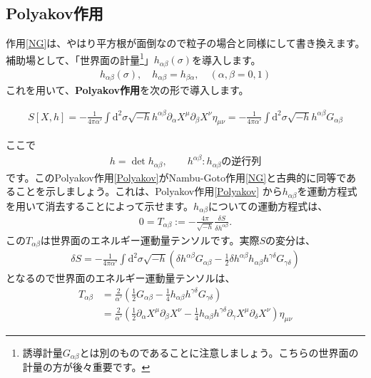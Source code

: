 \documentclass[report,paper=a4, fontsize=12pt, line_length=16cm, number_of_lines=33,dvipdfmx]{jlreq}
\newenvironment{important}{\begin{tcolorbox}[
  colback = white,
  colframe = red!35,
  boxrule = 2mm,
  fonttitle = \bfseries,
  after = \noindent] }{\end{tcolorbox}}
\numberwithin{equation}{chapter}
\numberwithin{equation}{section}
\newcommand{\del}{\partial}
\newcommand{\kyou}[1]{{\sffamily \bfseries #1}}
\newcommand{\di}{\mathrm{d}}
\begin{document}
\subsection{Polyakov作用}
作用\eqref{NG}は、やはり平方根が面倒なので粒子の場合と同様にして書き換えます。
補助場として、「世界面の計量\footnote{誘導計量$G_{\alpha\beta}$とは別のものであることに注意しましょう。こちらの世界面の計量の方が後々重要です。}」$h_{\alpha\beta}(\sigma)$を導入します。
\begin{align}
h_{\alpha\beta}(\sigma),\quad
h_{\alpha\beta}=h_{\beta\alpha},\quad
(\alpha,\beta=0,1)
\end{align}
これを用いて、\kyou{Polyakov作用}を次の形で導入します。
\begin{important}
  \begin{align}
    S[X,h]=-\frac{1}{4\pi\alpha'}\int \di^2\sigma \sqrt{-h}h^{\alpha\beta}\del_{\alpha}X^{\mu}\del_{\beta}X^{\nu}\eta_{\mu\nu}=
    -\frac{1}{4\pi\alpha'}\int \di^2\sigma \sqrt{-h}h^{\alpha\beta}G_{\alpha\beta}
    \label{Polyakov}
    \end{align}      
\end{important}
ここで
\begin{align}
h=\det h_{\alpha\beta},\qquad h^{\alpha\beta} : h_{\alpha\beta}\text{の逆行列}
\end{align}
です。このPolyakov作用\eqref{Polyakov}がNambu-Goto作用\eqref{NG}と古典的に同等であることを示しましょう。これは、Polyakov作用\eqref{Polyakov}
から$h_{\alpha\beta}$を運動方程式を用いて消去することによって示せます。$h_{\alpha\beta}$についての運動方程式は、
\begin{align}
0=T_{\alpha\beta}:=-\frac{4\pi}{\sqrt{-h}}\frac{\delta S}{\delta h^{\alpha\beta}}. \label{constraintT}
\end{align}
この$T_{\alpha\beta}$は世界面のエネルギー運動量テンソルです。実際$S$の変分は、
\begin{align}
\delta S=-\frac{1}{4\pi\alpha'}\int \di^2\sigma \sqrt{-h}\left(\delta h^{\alpha\beta}G_{\alpha\beta}-\frac12 \delta h^{\alpha\beta} h_{\alpha\beta}
h^{\gamma\delta}G_{\gamma\delta}
\right)
\end{align}
となるので世界面のエネルギー運動量テンソルは、
\begin{align}
 T_{\alpha\beta}&=\frac{2}{\alpha'}\left(\frac12 G_{\alpha\beta}-\frac14 h_{\alpha\beta}h^{\gamma\delta}G_{\gamma\delta}\right)\nonumber\\
 &=\frac{2}{\alpha'}\left(\frac12 \del_{\alpha}X^{\mu}\del_{\beta}X^{\nu} - \frac14 h_{\alpha\beta}h^{\gamma\delta}\del_{\gamma} X^{\mu}\del_{\delta}X^{\nu}\right)\eta_{\mu\nu}
 \label{EM}
\end{align}
\end{document}
